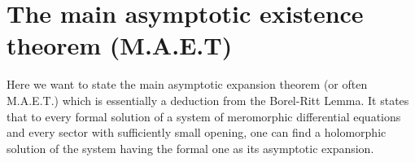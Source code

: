 
\section{The main asymptotic existence theorem (M.A.E.T)}\label{sec:MAET}
\begin{comment}
  \begin{multicols}{2}
    \textbf{Classical:}
    \begin{itemize}
      \item \cite[Thm.4.4.1]{Loday2014}
      \item \cite[Thm.7.10]{van2003galois}{\tiny\cite[Thm.7.12]{van2003galois}}
      \item \cite[Thm.IV.12.1]{wasow2002asymptotic}
      \item \cite[5.3.Thm.1]{Varadarajan96linearmeromorphic}
      \item \cite[207]{Balser2000Formal}: Some historical remarks
      \item \cite[Thm.A]{BJL1979Birkhoff}
    \end{itemize}
  \columnbreak
    \textbf{Sheafical:}
    \begin{itemize}
      \item \cite[Thm.2.3.1]{sabbah_cimpa90}
      \item \cite[Sec.4.4]{Loday2014}
    \end{itemize}
  \end{multicols}
\end{comment}
Here we want to state the main asymptotic expansion theorem (or often M.A.E.T.)
which is essentially a deduction from the Borel-Ritt Lemma.
It states that to every formal solution of a system of meromorphic differential
equations and every sector with sufficiently small opening, one can find a
holomorphic solution of the system having the formal one as its asymptotic
expansion.

